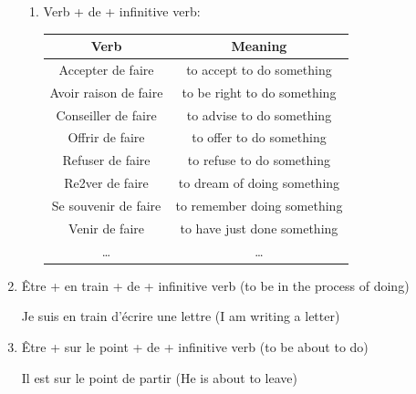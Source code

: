 \documentclass{book}
\begin{document}
\begin{enumerate}
\begin{enumerate}
                        \item Verb + de + infinitive verb:
                            \begin{center}
                                \begin{tabular}{|c|c|}
                                    \hline
                                    \textbf{Verb} & \textbf{Meaning}\\
                                    \hline
                                    Accepter de faire & to accept to do something \\
                                    Avoir raison de faire & to be right to do something \\
                                    Conseiller de faire & to advise to do something \\
                                    Offrir de faire & to offer to do something \\
                                    Refuser de faire & to refuse to do something \\
                                    Re2ver de faire & to dream of doing something \\
                                    Se souvenir de faire & to remember doing something \\
                                    Venir de faire & to have just done something \\
                                    \dots & \dots \\
                                    \hline
                                \end{tabular}
                            \end{center}
                    \end{enumerate}
                
                \item Être + en train + de + infinitive verb (to be in the process of doing)
                    \begin{center}
                        Je suis en train d'écrire une lettre (I am writing a letter)
                    \end{center}
                
                \item Être + sur le point + de + infinitive verb (to be about to do)
                    \begin{center}
                        Il est sur le point de partir (He is about to leave)
                    \end{center}
                

\end{enumerate}
\end{document}
